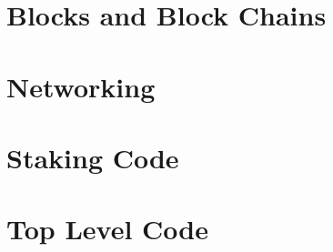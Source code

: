\documentclass{book}
\begin{document}


\chapter{Blocks and Block Chains}\label{chap:block}



\chapter{Networking}\label{chap:net}



\chapter{Staking Code}\label{chap:stk}



\chapter{Top Level Code}\label{chap:top}



\printindex



\end{document}
